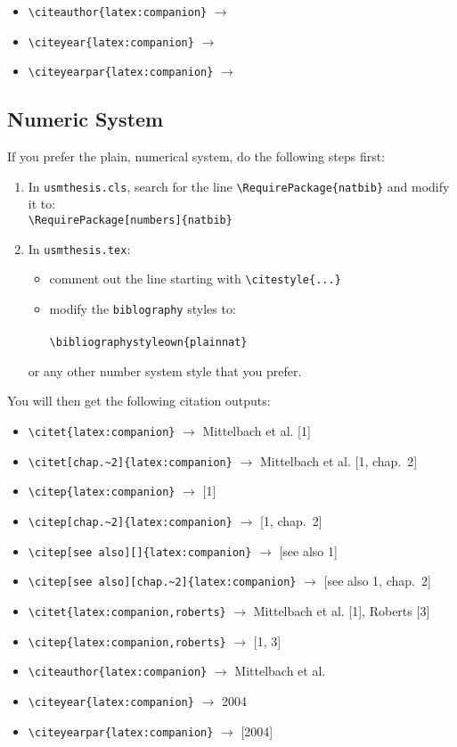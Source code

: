 \begin{itemize}[nosep]
\item \verb|\citeauthor{latex:companion}| $\to$ \citeauthor{latex:companion}
\item \verb|\citeyear{latex:companion}| $\to$ \citeyear{latex:companion}
\item \verb|\citeyearpar{latex:companion}| $\to$ \citeyearpar{latex:companion}
\end{itemize}

\subsection{Numeric System}

If you prefer the plain, numerical system, do the following steps first:
\begin{enumerate}[nosep]
  \item In \texttt{usmthesis.cls}, search for the line \verb|\RequirePackage{natbib}| and modify it to:\\
  \verb|\RequirePackage[numbers]{natbib}|
  \item In \texttt{usmthesis.tex}:
  \begin{itemize}[nosep]
    \item comment out the line starting with \verb|\citestyle{...}|
    \item modify the \verb|biblography| styles to: \\
      \verb|| \\
      \verb|\bibliographystyleown{plainnat}|
    \end{itemize}
    or any other number system style that you prefer.
\end{enumerate}

You will then get the following citation outputs: 


\begin{itemize}[nosep]
\item \verb|\citet{latex:companion}| $\to$ Mittelbach et al. [1]
\item \verb|\citet[chap.~2]{latex:companion}| $\to$ Mittelbach et al. [1, chap.~2]
\item \verb|\citep{latex:companion}| $\to$ [1]
\item \verb|\citep[chap.~2]{latex:companion}| $\to$ [1, chap.~2]
\item \verb|\citep[see also][]{latex:companion}| $\to$ [see also 1]
\item \verb|\citep[see also][chap.~2]{latex:companion}| $\to$ [see also 1, chap.~2]
\item \verb|\citet{latex:companion,roberts}| $\to$ Mittelbach et al. [1], Roberts [3]
\item \verb|\citep{latex:companion,roberts}| $\to$ [1, 3]
\item \verb|\citeauthor{latex:companion}| $\to$ Mittelbach et al.
\item \verb|\citeyear{latex:companion}| $\to$ 2004
\item \verb|\citeyearpar{latex:companion}| $\to$ [2004]
\end{itemize}